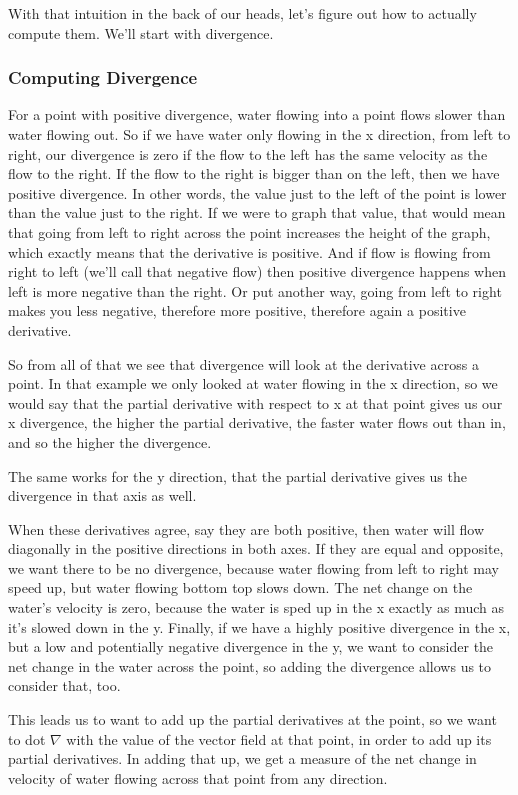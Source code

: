 \documentclass[12pt, letterpaper]{article}
\begin{document}
With that intuition in the back of our heads, let's figure out how to actually compute them. We'll start with divergence.

\subsubsection{Computing Divergence}
For a point with positive divergence, water flowing into a point flows slower than water flowing out. 
So if we have water only flowing in the x direction, from left to right, our divergence is zero if the flow to the left has the same velocity as the flow to the right.
If the flow to the right is bigger than on the left, then we have positive divergence.
In other words, the value just to the left of the point is lower than the value just to the right.
If we were to graph that value, that would mean that going from left to right across the point increases the height of the graph, which exactly means that the derivative is positive.
And if flow is flowing from right to left (we'll call that negative flow) then positive divergence happens when left is more negative than the right.
Or put another way, going from left to right makes you less negative, therefore more positive, therefore again a positive derivative.

So from all of that we see that divergence will look at the derivative across a point.
In that example we only looked at water flowing in the x direction, so we would say that the partial derivative with respect to x at that point gives us our x divergence, the higher the partial derivative, the faster water flows out than in, and so the higher the divergence.

The same works for the y direction, that the partial derivative gives us the divergence in that axis as well.

When these derivatives agree, say they are both positive, then water will flow diagonally in the positive directions in both axes.
If they are equal and opposite, we want there to be no divergence, because water flowing from left to right may speed up, but water flowing bottom top slows down.
The net change on the water's velocity is zero, because the water is sped up in the x exactly as much as it's slowed down in the y.
Finally, if we have a highly positive divergence in the x, but a low and potentially negative divergence in the y, we want to consider the net change in the water across the point,
so adding the divergence allows us to consider that, too.

This leads us to want to add up the partial derivatives at the point, so we want to dot $\nabla$ with the value of the vector field at that point, in order to add up its partial derivatives.
In adding that up, we get a measure of the net change in velocity of water flowing across that point from any direction. 
\end{document}
